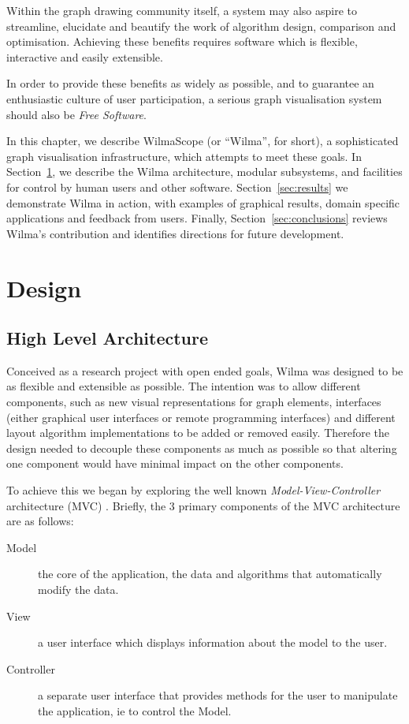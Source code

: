 \documentclass[runningheads]{cl2emult}
\begin{document}
Within the graph drawing community itself, a system may also aspire to 
streamline, elucidate and beautify the work of algorithm design, comparison
and optimisation.  Achieving these benefits requires software which is
flexible, interactive and easily extensible.

In order to provide these benefits as widely as possible, and to guarantee
an enthusiastic culture of user participation, a serious graph visualisation
system should also be {\em Free Software}\cite{stallman92why}.

In this chapter, we describe WilmaScope (or ``Wilma'', for short), a
sophisticated graph visualisation infrastructure, which attempts to meet
these goals.  In Section~\ref{sec:design}, we describe the Wilma
architecture, modular subsystems, and facilities for control by human users
and other software.  Section~\ref{sec:results} we demonstrate Wilma in
action, with examples of graphical results, domain specific applications and
feedback from users.  Finally, Section~\ref{sec:conclusions} reviews Wilma's
contribution and identifies directions for future development.

\section{Design}\label{sec:design}
\subsection{High Level Architecture}
Conceived as a research project with open ended goals, Wilma was
designed to be as flexible and extensible as possible.  The intention
was to allow different components, such as new visual representations
for graph elements, interfaces (either graphical user interfaces or
remote programming interfaces) and different 
layout algorithm implementations to be added or removed easily.
Therefore the design needed to decouple these components as much as
possible so that altering one component would have minimal impact on
the other components.

To achieve this we began by exploring the well known {\em Model-View-Controller}
architecture (MVC) \cite{gamma94design}.  Briefly, the 3 primary components of the MVC architecture are as follows:
\begin{description}
\item[Model] the core
of the application, the data and algorithms that automatically modify
the data. 
\item[View] a user interface which displays information
about the model to the user. 
\item[Controller] a separate user
interface that provides methods for the user to manipulate the
application, ie to control the Model.  
\end{description}
\end{document}
